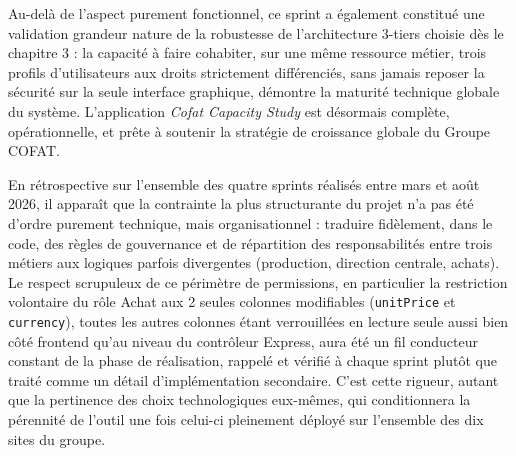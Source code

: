 Au-delà de l'aspect purement fonctionnel, ce sprint a également constitué une validation grandeur nature de la robustesse de l'architecture 3-tiers choisie dès le chapitre 3 : la capacité à faire cohabiter, sur une même ressource métier, trois profils d'utilisateurs aux droits strictement différenciés, sans jamais reposer la sécurité sur la seule interface graphique, démontre la maturité technique globale du système. L'application \textit{Cofat Capacity Study} est désormais complète, opérationnelle, et prête à soutenir la stratégie de croissance globale du Groupe COFAT.

En rétrospective sur l'ensemble des quatre sprints réalisés entre mars et août 2026, il apparaît que la contrainte la plus structurante du projet n'a pas été d'ordre purement technique, mais organisationnel : traduire fidèlement, dans le code, des règles de gouvernance et de répartition des responsabilités entre trois métiers aux logiques parfois divergentes (production, direction centrale, achats). Le respect scrupuleux de ce périmètre de permissions, en particulier la restriction volontaire du rôle Achat aux 2 seules colonnes modifiables (\texttt{unitPrice} et \texttt{currency}), toutes les autres colonnes étant verrouillées en lecture seule aussi bien côté frontend qu'au niveau du contrôleur Express, aura été un fil conducteur constant de la phase de réalisation, rappelé et vérifié à chaque sprint plutôt que traité comme un détail d'implémentation secondaire. C'est cette rigueur, autant que la pertinence des choix technologiques eux-mêmes, qui conditionnera la pérennité de l'outil une fois celui-ci pleinement déployé sur l'ensemble des dix sites du groupe.
